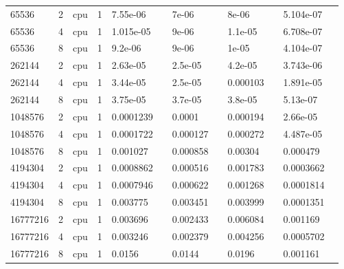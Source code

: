 \begin{tabular}{llllllllllll}
65536 & 2 & cpu & 1 & 7.55e-06 &  & 7e-06 &  & 8e-06 &  & 5.104e-07 &  \\
65536 & 4 & cpu & 1 & 1.015e-05 &  & 9e-06 &  & 1.1e-05 &  & 6.708e-07 &  \\
65536 & 8 & cpu & 1 & 9.2e-06 &  & 9e-06 &  & 1e-05 &  & 4.104e-07 &  \\
262144 & 2 & cpu & 1 & 2.63e-05 &  & 2.5e-05 &  & 4.2e-05 &  & 3.743e-06 &  \\
262144 & 4 & cpu & 1 & 3.44e-05 &  & 2.5e-05 &  & 0.000103 &  & 1.891e-05 &  \\
262144 & 8 & cpu & 1 & 3.75e-05 &  & 3.7e-05 &  & 3.8e-05 &  & 5.13e-07 &  \\
1048576 & 2 & cpu & 1 & 0.0001239 &  & 0.0001 &  & 0.000194 &  & 2.66e-05 &  \\
1048576 & 4 & cpu & 1 & 0.0001722 &  & 0.000127 &  & 0.000272 &  & 4.487e-05 &  \\
1048576 & 8 & cpu & 1 & 0.001027 &  & 0.000858 &  & 0.00304 &  & 0.000479 &  \\
4194304 & 2 & cpu & 1 & 0.0008862 &  & 0.000516 &  & 0.001783 &  & 0.0003662 &  \\
4194304 & 4 & cpu & 1 & 0.0007946 &  & 0.000622 &  & 0.001268 &  & 0.0001814 &  \\
4194304 & 8 & cpu & 1 & 0.003775 &  & 0.003451 &  & 0.003999 &  & 0.0001351 &  \\
16777216 & 2 & cpu & 1 & 0.003696 &  & 0.002433 &  & 0.006084 &  & 0.001169 &  \\
16777216 & 4 & cpu & 1 & 0.003246 &  & 0.002379 &  & 0.004256 &  & 0.0005702 &  \\
16777216 & 8 & cpu & 1 & 0.0156 &  & 0.0144 &  & 0.0196 &  & 0.001161 &  \\
\hline
\end{tabular}
